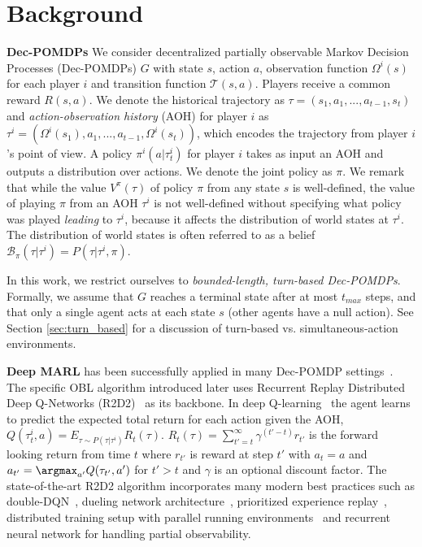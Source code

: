 \section{Background}
\label{sec:background}

\textbf{Dec-POMDPs} We consider decentralized partially observable Markov Decision Processes (Dec-POMDPs) \cite{nair2003taming} $G$ with state $s$, action $a$, observation function $\Omega^i(s)$ for each player $i$ and transition function $\mathcal{T}(s, a)$. Players receive a common reward $R(s, a)$. We denote the historical trajectory as $\tau =(s_1, a_1, ..., a_{t-1}, s_t)$ and \textit{action-observation history} (AOH) for player $i$ as $\tau^i = (\Omega^i(s_1), a_1, ..., a_{t-1}, \Omega^i(s_t))$, which encodes the trajectory from player $i$'s point of view. A policy $\pi^i(a|\tau_t^i)$ for player $i$ takes as input an AOH and outputs a distribution over actions. We denote the joint policy as $\pi$. We remark that while the value $V^\pi(\tau)$ of policy $\pi$ from any state $s$ is well-defined, the value of playing $\pi$ from an AOH $\tau^i$ is not well-defined without specifying what policy was played \textit{leading} to $\tau^i$, because it affects the distribution of world states at $\tau^i$. The distribution of world states is often referred to as a belief $\mathcal{B}_{\pi}(\tau|\tau^i)=P(\tau|\tau^i,\pi)$. 

In this work, we restrict ourselves to \textit{bounded-length, turn-based Dec-POMDPs}. Formally, we assume that $G$ reaches a terminal state after at most $t_{max}$ steps, and that only a single agent acts at each state $s$ (other agents have a null action). See Section \ref{sec:turn_based} for a discussion of turn-based vs. simultaneous-action environments. 

\textbf{Deep MARL} has been successfully applied in many Dec-POMDP settings~\citep{mackrl,foerster2019bayesian}. The specific OBL algorithm introduced later uses Recurrent Replay Distributed Deep Q-Networks (R2D2)~\citep{r2d2} as its backbone. In deep Q-learning~\citep{dqn} the agent learns to predict the expected total return for each action given the AOH, $Q(\tau^{i}_{t}, a) = E_{\tau \sim P(\tau | \tau^{i})} R_{t}(\tau)$. $R_{t}(\tau) = \sum_{t'=t}^{\infty} \gamma^{(t' - t)} r_{t'}$ is the forward looking return from time $t$ where $r_{t'}$ is reward at step $t'$ with $a_t = a$ and $a_{t'} = \argmax_{a'} Q(\tau_{t'}, a')$ for $t' > t$ and $\gamma$ is an optional discount factor. The state-of-the-art R2D2 algorithm incorporates many modern best practices such as double-DQN~\citep{double-dqn}, dueling network architecture~\citep{dueling-dqn}, prioritized experience replay~\citep{prioritized-replay}, distributed training setup with parallel running environments~\citep{apex} and recurrent neural network for handling partial observability. 

